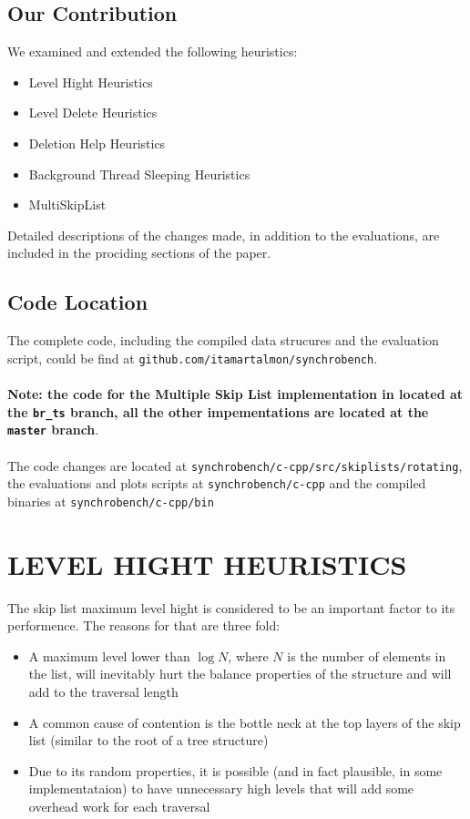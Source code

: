 \documentclass{article}
\begin{document}
\subsection{Our Contribution}
\label{ssec:oc}

We examined and extended the following heuristics:

\begin{itemize}
	\item Level Hight Heuristics
	\item Level Delete Heuristics 
	\item Deletion Help Heuristics
	\item Background Thread Sleeping Heuristics
	\item MultiSkipList
\end{itemize}

\hfill \break
Detailed descriptions of the changes made, in addition to the evaluations, are included in the prociding sections of the paper.

\subsection{Code Location}
\label{ssec:cl}
The complete code, including the compiled data strucures and the evaluation script, could be find at \texttt{github.com/itamartalmon/synchrobench}.\\\\\textbf{Note: the code for the Multiple Skip List implementation in located at the \texttt{br\_ts} branch, all the other impementations are located at the \texttt{master} branch}.\\\\ The code changes are located at \texttt{synchrobench/c-cpp/src/skiplists/rotating}, the evaluations and plots scripts at  \texttt{synchrobench/c-cpp} and the compiled binaries at \texttt{synchrobench/c-cpp/bin}

\section{LEVEL HIGHT HEURISTICS}
\label{sec:lhh}

The skip list maximum level hight is considered to be an important factor to its performence. The reasons for that are three fold:

\begin{itemize}
	\item  A maximum level lower than $\log{N}$, where $N$ is the number of elements in the list, will inevitably hurt the balance properties of the structure and will add to the traversal length
	\item A common cause of contention is the bottle neck at the top layers of the skip list (similar to the root of a tree structure)
	\item Due to its random properties, it is possible (and in fact plausible, in some implementataion) to have unnecessary high levels that will add some overhead work for each traversal
\end{itemize}
\end{document}
